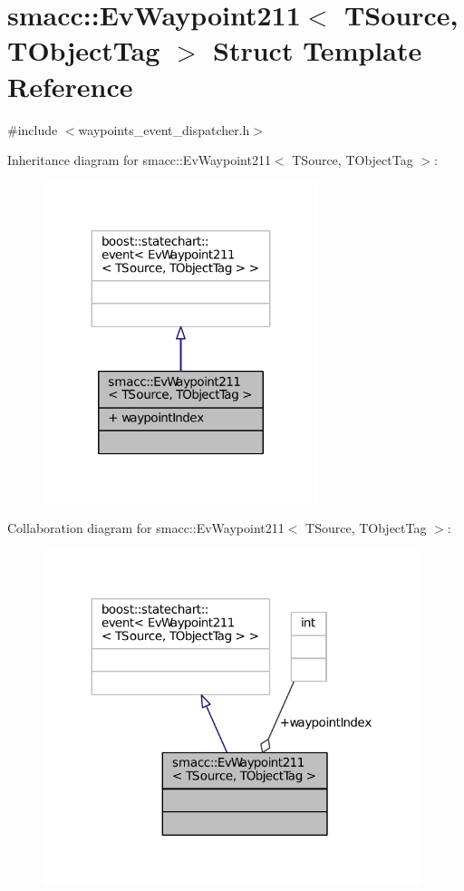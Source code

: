 \hypertarget{structsmacc_1_1EvWaypoint211}{}\section{smacc\+:\+:Ev\+Waypoint211$<$ T\+Source, T\+Object\+Tag $>$ Struct Template Reference}
\label{structsmacc_1_1EvWaypoint211}


{\ttfamily \#include $<$waypoints\+\_\+event\+\_\+dispatcher.\+h$>$}



Inheritance diagram for smacc\+:\+:Ev\+Waypoint211$<$ T\+Source, T\+Object\+Tag $>$\+:
\nopagebreak
\begin{figure}[H]
\begin{center}
\leavevmode
\includegraphics[width=227pt]{structsmacc_1_1EvWaypoint211__inherit__graph}
\end{center}
\end{figure}


Collaboration diagram for smacc\+:\+:Ev\+Waypoint211$<$ T\+Source, T\+Object\+Tag $>$\+:
\nopagebreak
\begin{figure}[H]
\begin{center}
\leavevmode
\includegraphics[width=312pt]{structsmacc_1_1EvWaypoint211__coll__graph}
\end{center}
\end{figure}

